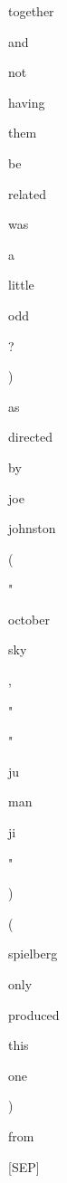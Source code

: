 \documentclass[varwidth=150mm]{standalone}
\begin{document}
\begin{CJK*}{UTF8}{gbsn}
{{{\colorbox{red!0.0}{\strut together} \colorbox{red!1.2472202777862549}{\strut and} \colorbox{red!1.3590641021728516}{\strut not} \colorbox{red!0.0}{\strut having} \colorbox{red!1.3272581100463867}{\strut them} \colorbox{red!0.0}{\strut be} \colorbox{red!1.727602481842041}{\strut related} \colorbox{red!0.0}{\strut was} \colorbox{red!0.0}{\strut a} \colorbox{red!0.0}{\strut little} \colorbox{red!0.0}{\strut odd} \colorbox{red!1.5208829641342163}{\strut ?} \colorbox{red!1.0004730224609375}{\strut )} \colorbox{red!3.2972495555877686}{\strut as} \colorbox{red!0.0}{\strut directed} \colorbox{red!0.0}{\strut by} \colorbox{red!0.0}{\strut joe} \colorbox{red!0.0}{\strut johnston} \colorbox{red!1.1483389139175415}{\strut (} \colorbox{red!1.1063690185546875}{\strut "} \colorbox{red!0.0}{\strut october} \colorbox{red!0.0}{\strut sky} \colorbox{red!0.0}{\strut ,} \colorbox{red!1.0923171043395996}{\strut "} \colorbox{red!2.2722365856170654}{\strut "} \colorbox{red!0.0}{\strut ju}\colorbox{red!0.0}{\strut man}\colorbox{red!0.0}{\strut ji} \colorbox{red!2.3007190227508545}{\strut "} \colorbox{red!0.0}{\strut )} \colorbox{red!0.0}{\strut (} \colorbox{red!1.59561026096344}{\strut spielberg} \colorbox{red!0.0}{\strut only} \colorbox{red!0.0}{\strut produced} \colorbox{red!0.0}{\strut this} \colorbox{red!1.2085189819335938}{\strut one} \colorbox{red!0.0}{\strut )} \colorbox{red!6.10692834854126}{\strut from} \colorbox{red!1.726317048072815}{\strut [SEP]}
}}}
\end{CJK*}
\end{document}
